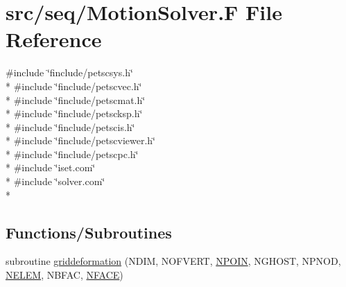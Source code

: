 \hypertarget{seq_2_motion_solver_8_f}{\section{src/seq/\-Motion\-Solver.F File Reference}
\label{seq_2_motion_solver_8_f}
}
{\ttfamily \#include \char`\"{}finclude/petscsys.\-h\char`\"{}}\\*
{\ttfamily \#include \char`\"{}finclude/petscvec.\-h\char`\"{}}\\*
{\ttfamily \#include \char`\"{}finclude/petscmat.\-h\char`\"{}}\\*
{\ttfamily \#include \char`\"{}finclude/petscksp.\-h\char`\"{}}\\*
{\ttfamily \#include \char`\"{}finclude/petscis.\-h\char`\"{}}\\*
{\ttfamily \#include \char`\"{}finclude/petscviewer.\-h\char`\"{}}\\*
{\ttfamily \#include \char`\"{}finclude/petscpc.\-h\char`\"{}}\\*
{\ttfamily \#include \char`\"{}iset.\-com\char`\"{}}\\*
{\ttfamily \#include \char`\"{}solver.\-com\char`\"{}}\\*
\subsection*{Functions/\-Subroutines}
\begin{DoxyCompactItemize}
\item 
subroutine \hyperlink{seq_2_motion_solver_8_f_a256a1041b4e06832537fd6930a559785}{griddeformation} (N\-D\-I\-M, N\-O\-F\-V\-E\-R\-T, \hyperlink{mesh_8com_ae28c1572321efcd8715b974d87d20c58}{N\-P\-O\-I\-N}, N\-G\-H\-O\-S\-T, N\-P\-N\-O\-D, \hyperlink{mesh_8com_aee5e75b79d0e815c0603cfbccc618957}{N\-E\-L\-E\-M}, N\-B\-F\-A\-C, \hyperlink{mesh_8com_a78142d59d4cbb9fedbede16187658dd3}{N\-F\-A\-C\-E})
\end{DoxyCompactItemize}


